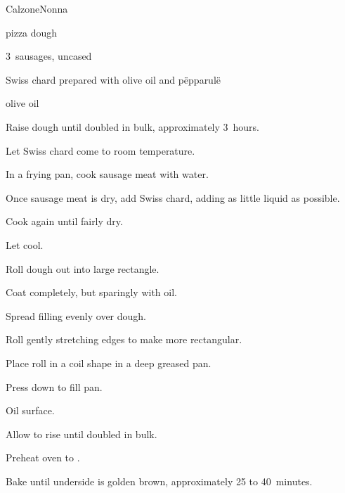 \begin{recipe}{Calzone}{Nonna}{}

\begin{ingredients}
\item pizza dough
\item 3~sausages, uncased
\item Swiss chard prepared with olive oil and p\"epparul\"e
\item olive oil
\end{ingredients}

\begin{directions}
\item Raise dough until doubled in bulk, approximately 3~hours.
\item Let Swiss chard come to room temperature.
\item In a frying pan, cook sausage meat with \C{\quarter} water.
\item Once sausage meat is dry, add Swiss chard, adding as little liquid as possible.
\item Cook again until fairly dry.
\item Let cool.
\item Roll dough out into large rectangle.
\item Coat completely, but sparingly with oil.
\item Spread filling evenly over dough.
\item Roll gently stretching edges to make more rectangular.
\item Place roll in a coil shape in a deep greased pan.
\item Press down to fill pan.
\item Oil surface.
\item Allow to rise until doubled in bulk.
\item Preheat oven to .
\item Bake until underside is golden brown, approximately 25 to 40~minutes.
\end{directions}

\end{recipe}
